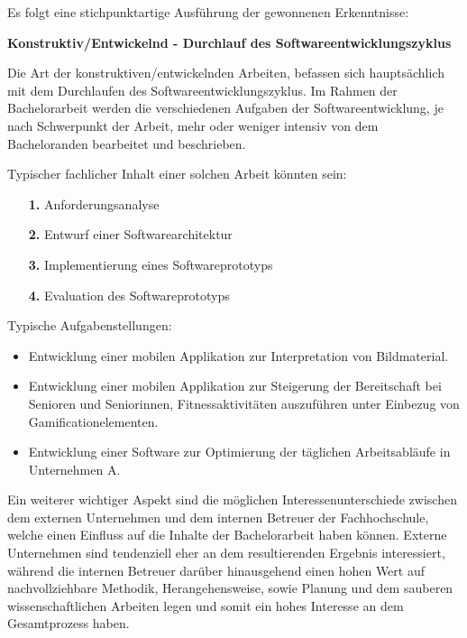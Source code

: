 \documentclass[bibliography=totoc,listof=totoc,BCOR=5mm,DIV=12,oneside]{scrbook}
\begin{document}
\par\medskip Es folgt eine stichpunktartige Ausführung der gewonnenen Erkenntnisse:


\par \bigskip \textbf{Konstruktiv/Entwickelnd - Durchlauf des Softwareentwicklungszyklus}
\par \medskip Die Art der konstruktiven/entwickelnden Arbeiten, befassen sich hauptsächlich mit dem Durchlaufen des Softwareentwicklungszyklus. Im Rahmen der Bachelorarbeit werden die verschiedenen Aufgaben der Softwareentwicklung, je nach Schwerpunkt der Arbeit, mehr oder weniger intensiv von dem Bacheloranden bearbeitet und beschrieben.
\par \medskip Typischer fachlicher Inhalt einer solchen Arbeit könnten sein:
\begin{itemize}
\item[\textbf{1.}] Anforderungsanalyse
\item[\textbf{2.}] Entwurf einer Softwarearchitektur
\item[\textbf{3.}] Implementierung eines Softwareprototyps
\item[\textbf{4.}] Evaluation des Softwareprototyps
\end{itemize}

\par \medskip Typische Aufgabenstellungen:
\begin{itemize}
\item Entwicklung einer mobilen Applikation zur Interpretation von Bildmaterial.
\item Entwicklung einer mobilen Applikation zur Steigerung der Bereitschaft bei Senioren und Seniorinnen, Fitnessaktivitäten auszuführen unter Einbezug von  Gamificationelementen.
\item Entwicklung einer Software zur Optimierung der täglichen Arbeitsabläufe in Unternehmen A.
\end{itemize}

\par \medskip Ein weiterer wichtiger Aspekt sind die möglichen Interessenunterschiede zwischen dem externen Unternehmen und dem internen Betreuer der Fachhochschule, welche einen Einfluss auf die Inhalte der Bachelorarbeit haben können. Externe Unternehmen sind tendenziell eher an dem resultierenden Ergebnis interessiert, während die internen Betreuer darüber hinausgehend einen hohen Wert auf nachvollziehbare Methodik, Herangehensweise, sowie Planung und dem sauberen wissenschaftlichen Arbeiten legen und somit ein  hohes Interesse an dem Gesamtprozess haben.
\end{document}
